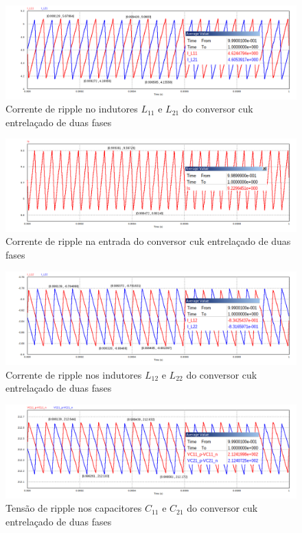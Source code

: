 \documentclass[
	12pt,				%
	openany,
	onseside,
	a4paper,			%
	english,			%
	french,				%
	spanish,			%
	brazil,				%
	]{abntex2}
\begin{document}
\begin{figure}[htb]%
	\captionsetup{justification=centering}
	\centering
		\includegraphics[width= \linewidth]{cuk_inter_ripp_I_LX1}
		\caption{Corrente de ripple no indutores $L_{11}$ e $L_{21}$ do conversor cuk entrelaçado de duas fases}
		\label{fig:cuk_inter_ripp_I_L1}
\end{figure}

\begin{figure}[htb]%
	\captionsetup{justification=centering}
	\centering
		\includegraphics[width= \linewidth]{cuk_inter_ripp_I_S}
		\caption{Corrente de ripple na entrada do conversor cuk entrelaçado de duas fases}
		\label{fig:cuk_inter_ripp_I_S}
\end{figure}

\begin{figure}[H]%
	\captionsetup{justification=centering}
	\centering
		\includegraphics[width= \linewidth]{cuk_inter_ripp_I_LX2}
		\caption{Corrente de ripple nos indutores $L_{12}$ e $L_{22}$ do conversor cuk entrelaçado de duas fases}
		\label{fig:cuk_inter_ripp_I_L2}
\end{figure}

\begin{figure}[H]%
	\captionsetup{justification=centering}
	\centering
		\includegraphics[width= \linewidth]{cuk_inter_ripp_V_CX1}
		\caption{Tensão de ripple nos capacitores $C_{11}$ e $C_{21}$ do conversor cuk entrelaçado de duas fases}
		\label{fig:cuk_inter_ripp_V_C1}
\end{figure}
\end{document}
